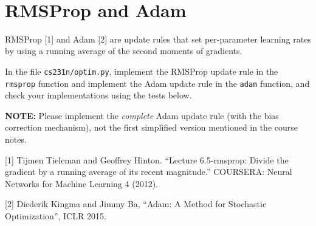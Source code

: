 \documentclass[11pt]{article}
\begin{document}
    \begin{center}
    \end{center}
    { \hspace*{\fill} \\}
    
    \hypertarget{rmsprop-and-adam}{%
\section{RMSProp and Adam}\label{rmsprop-and-adam}}

RMSProp {[}1{]} and Adam {[}2{]} are update rules that set per-parameter
learning rates by using a running average of the second moments of
gradients.

In the file \texttt{cs231n/optim.py}, implement the RMSProp update rule
in the \texttt{rmsprop} function and implement the Adam update rule in
the \texttt{adam} function, and check your implementations using the
tests below.

\textbf{NOTE:} Please implement the \emph{complete} Adam update rule
(with the bias correction mechanism), not the first simplified version
mentioned in the course notes.

{[}1{]} Tijmen Tieleman and Geoffrey Hinton. ``Lecture 6.5-rmsprop:
Divide the gradient by a running average of its recent magnitude.''
COURSERA: Neural Networks for Machine Learning 4 (2012).

{[}2{]} Diederik Kingma and Jimmy Ba, ``Adam: A Method for Stochastic
Optimization'', ICLR 2015.
\end{document}
